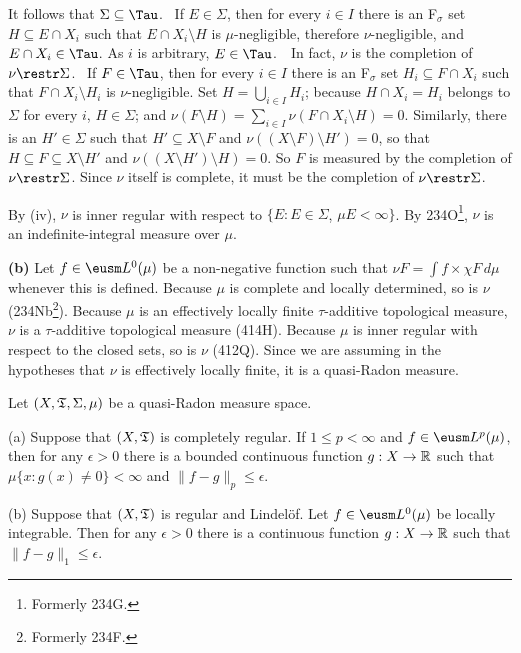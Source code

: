 {\medskip

 It follows that $\Sigma\subseteq\Tau$.   \Prf\ If
$E\in\Sigma$, then for every $i\in I$ there is an F$_{\sigma}$ set
$H\subseteq E\cap X_i$ such that $E\cap X_i\setminus H$ is
$\mu$-negligible, therefore $\nu$-negligible, and $E\cap X_i\in\Tau$.
As $i$ is arbitrary, $E\in\Tau$.\ \QeD\   In fact, $\nu$ is the
completion of $\nu\restr\Sigma$.   \Prf\ If $F\in\Tau$, then for every
$i\in I$ there is an F$_{\sigma}$ set $H_i\subseteq F\cap X_i$ such that
$F\cap X_i\setminus H_i$ is $\nu$-negligible.   Set
$H=\bigcup_{i\in I}H_i$;  because $H\cap X_i=H_i$ belongs to $\Sigma$
for every $i$, $H\in\Sigma$;  and
$\nu(F\setminus H)=\sum_{i\in I}\nu(F\cap X_i\setminus H)=0$.
Similarly, there is an $H'\in\Sigma$ such that $H'\subseteq X\setminus
F$ and $\nu((X\setminus F)\setminus H')=0$, so that $H\subseteq
F\subseteq X\setminus H'$ and $\nu((X\setminus H')\setminus H)=0$.   So
$F$ is measured by the completion of $\nu\restr\Sigma$.   Since $\nu$
itself is complete, it must be the completion of $\nu\restr\Sigma$.\
\Qed

\medskip

 By (iv), $\nu$ is inner regular with respect to
$\{E:E\in\Sigma$, $\mu E<\infty\}$.   By 234O\footnote{Formerly 2{}34G.},
$\nu$ is an indefinite-integral measure over $\mu$.

\medskip

{\bf (b)} Let $f\in\eusm L^0(\mu)$ be a non-negative function such that
$\nu F=\int f\times\chi F\,d\mu$ whenever this is defined.   Because
$\mu$ is complete and locally determined, so is $\nu$
(234Nb\footnote{Formerly 2{}34F.}).
Because $\mu$ is an effectively locally finite $\tau$-additive
topological measure, $\nu$ is a $\tau$-additive topological measure
(414H).   Because $\mu$ is inner regular with respect to the closed
sets, so is $\nu$ (412Q).   Since we are assuming in the hypotheses that
$\nu$ is effectively locally finite, it is a quasi-Radon measure.
}%

 Let $(X,\frak T,\Sigma,\mu)$ be a quasi-Radon
measure space.

(a) Suppose that $(X,\frak T)$ is completely regular.   If
$1\le p<\infty$ and $f\in\eusm L^p(\mu)$, then for any $\epsilon>0$
there is a bounded continuous
function $g:X\to\Bbb R$ such that $\mu\{x:g(x)\ne 0\}<\infty$ and
$\|f-g\|_p\le\epsilon$.

(b) Suppose that $(X,\frak T)$ is regular and Lindel\"of.   Let
$f\in\eusm L^0(\mu)$ be locally integrable.   Then for any $\epsilon>0$
there is a continuous function $g:X\to\Bbb R$ such that
$\|f-g\|_1\le\epsilon$.

